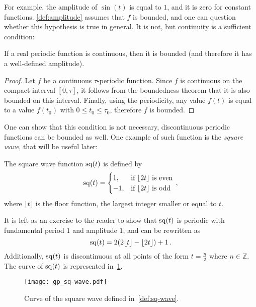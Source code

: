 \noindent For example, the amplitude of $\sin(t)$ is equal to $1$, and it is zero for
constant functions. \cref{def:amplitude} assumes that $f$ is bounded, and one can
question whether this hypothesis is true in general. It is not, but continuity is a
sufficient condition:
\begin{proposition}
  If a real periodic function is continuous, then it is bounded (and therefore it has a
  well-defined amplitude).
\end{proposition}
\begin{proof}
  Let $f$ be a continuous $\tau$-periodic function. Since $f$
  is continuous on the compact interval $[0,\tau]$, it follows from the boundedness theorem
  that it is also bounded on this interval. Finally, using the periodicity, any value
  $f(t)$ is equal to a value $f(t_0)$ with $0\leq t_0\leq \tau_0$, therefore $f$ is bounded.
\end{proof}
\noindent One can show that this condition is not necessary, \ie discontinuous periodic
functions can be bounded as well. One example of such function is the \emph{square wave},
that will be useful later:
\begin{definition}
  \label{def:sq-wave}
  The square wave function $\operatorname{sq}(t)$ is defined by
  \begin{equation}
    \operatorname{sq}(t)=
    \begin{cases}
      1, &\text{if~}\lfloor 2t\rfloor~\text{is even}\\
      -1, &\text{if~}\lfloor 2t\rfloor~\text{is odd}\\
    \end{cases}\,,
    \label{eq:wave-square}
  \end{equation}
  where $\lfloor t\rfloor$ is the floor function, \ie the largest integer smaller or equal
  to $t$.
\end{definition}
\noindent It is left as an exercise to the reader to show that $\operatorname{sq}(t)$ is periodic with
fundamental period $1$ and amplitude $1$, and can be rewritten as
\begin{equation}
  \operatorname{sq}(t)=2(2\lfloor t\rfloor-\lfloor 2t\rfloor)+1\,.
\end{equation}
Additionally, $\operatorname{sq}(t)$ is discontinuous at all points of the form $t=\frac{n}{2}$ where
$n\in\mathbb{Z}$. The curve of $\operatorname{sq}(t)$ is represented in~\cref{fig:sq-wave}.
\begin{figure}[t]
  \centering
  \texttt{[image: gp\_sq-wave.pdf]}
  \caption{Curve of the square wave defined in~\cref{def:sq-wave}.}
  \label{fig:sq-wave}
\end{figure}

